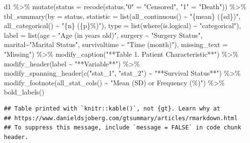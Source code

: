 \documentclass[
  10pt,
]{krantz}
\newenvironment{Shaded}{\begin{snugshade}}{\end{snugshade}}
\newcommand{\AttributeTok}[1]{\textcolor[rgb]{0.77,0.63,0.00}{#1}}
\newcommand{\FunctionTok}[1]{\textcolor[rgb]{0.00,0.00,0.00}{#1}}
\newcommand{\NormalTok}[1]{#1}
\newcommand{\OtherTok}[1]{\textcolor[rgb]{0.56,0.35,0.01}{#1}}
\newcommand{\SpecialCharTok}[1]{\textcolor[rgb]{0.00,0.00,0.00}{#1}}
\newcommand{\StringTok}[1]{\textcolor[rgb]{0.31,0.60,0.02}{#1}}
\begin{document}
\begin{Shaded}
\begin{Highlighting}[]
\NormalTok{d1 }\SpecialCharTok{\%\textgreater{}\%} \FunctionTok{mutate}\NormalTok{(}\AttributeTok{status =} \FunctionTok{recode}\NormalTok{(status,}\StringTok{"0"} \OtherTok{=} \StringTok{"Censored"}\NormalTok{, }\StringTok{"1"} \OtherTok{=} \StringTok{"Death"}\NormalTok{)) }\SpecialCharTok{\%\textgreater{}\%}
\FunctionTok{tbl\_summary}\NormalTok{(}\AttributeTok{by =}\NormalTok{ status,}
              \AttributeTok{statistic =} \FunctionTok{list}\NormalTok{(}\FunctionTok{all\_continuous}\NormalTok{() }\SpecialCharTok{\textasciitilde{}} \StringTok{"\{mean\} (\{sd\})"}\NormalTok{, }
                              \FunctionTok{all\_categorical}\NormalTok{() }\SpecialCharTok{\textasciitilde{}} \StringTok{"\{n\} (\{p\}\%)"}\NormalTok{),}
              \AttributeTok{type =} \FunctionTok{list}\NormalTok{(}\FunctionTok{where}\NormalTok{(is.logical) }\SpecialCharTok{\textasciitilde{}} \StringTok{"categorical"}\NormalTok{),}
              \AttributeTok{label =} \FunctionTok{list}\NormalTok{(age }\SpecialCharTok{\textasciitilde{}} \StringTok{"Age (in years old)"}\NormalTok{, surgery }\SpecialCharTok{\textasciitilde{}} \StringTok{"Surgery Status"}\NormalTok{, marital}\SpecialCharTok{\textasciitilde{}}\StringTok{"Marital Status"}\NormalTok{, survivaltime }\SpecialCharTok{\textasciitilde{}} \StringTok{"Time (month)"}\NormalTok{),}
            \AttributeTok{missing\_text =} \StringTok{"Missing"}\NormalTok{) }\SpecialCharTok{\%\textgreater{}\%} 
  \FunctionTok{modify\_caption}\NormalTok{(}\StringTok{"**Table 1. Patient Characteristic**"}\NormalTok{)  }\SpecialCharTok{\%\textgreater{}\%}
  \FunctionTok{modify\_header}\NormalTok{(label }\SpecialCharTok{\textasciitilde{}} \StringTok{"**Variable**"}\NormalTok{) }\SpecialCharTok{\%\textgreater{}\%} 
  \FunctionTok{modify\_spanning\_header}\NormalTok{(}\FunctionTok{c}\NormalTok{(}\StringTok{"stat\_1"}\NormalTok{, }\StringTok{"stat\_2"}\NormalTok{) }\SpecialCharTok{\textasciitilde{}} \StringTok{"**Survival Status**"}\NormalTok{) }\SpecialCharTok{\%\textgreater{}\%}
  \FunctionTok{modify\_footnote}\NormalTok{(}\FunctionTok{all\_stat\_cols}\NormalTok{() }\SpecialCharTok{\textasciitilde{}} \StringTok{"Mean (SD) or Frequency (\%)"}\NormalTok{) }\SpecialCharTok{\%\textgreater{}\%}
  \FunctionTok{bold\_labels}\NormalTok{()}
\end{Highlighting}
\end{Shaded}

\begin{verbatim}
## Table printed with `knitr::kable()`, not {gt}. Learn why at
## https://www.danieldsjoberg.com/gtsummary/articles/rmarkdown.html
## To suppress this message, include `message = FALSE` in code chunk header.
\end{verbatim}
\end{document}
